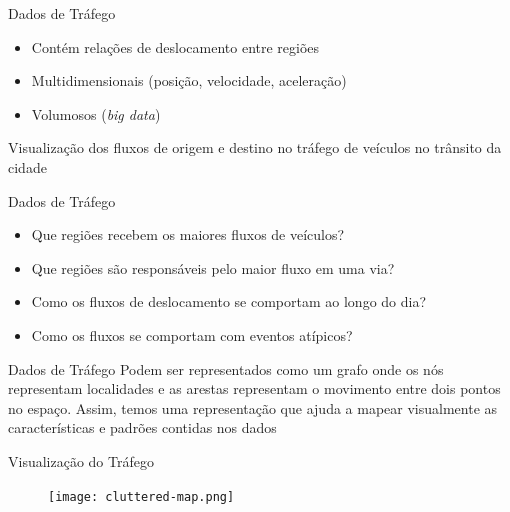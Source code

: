 
\begin{frame}{Dados de Tráfego}
  \begin{itemize}
    \item Contém relações de deslocamento entre regiões
    \item Multidimensionais (posição, velocidade, aceleração)
    \item Volumosos (\emph{big data})
  \end{itemize}
\end{frame}

\begin{frame}[standout]
  Visualização dos fluxos de origem e destino no tráfego de veículos no
trânsito da cidade
\end{frame}

\begin{frame}{Dados de Tráfego}
  \begin{itemize}
    \item Que regiões recebem os maiores fluxos de veículos?
    \item Que regiões são responsáveis pelo maior fluxo em uma via?
    \item Como os fluxos de deslocamento se comportam ao longo do dia?
    \item Como os fluxos se comportam com eventos atípicos?
  \end{itemize}
\end{frame}

\begin{frame}{Dados de Tráfego}
  Podem ser representados como um grafo onde os nós representam localidades e
as arestas representam o movimento entre dois pontos no espaço. Assim, temos
uma representação que ajuda a mapear visualmente as características e padrões
contidas nos dados
\end{frame}

{
\begin{frame}{Visualização do Tráfego}
  \begin{figure}[!htb]
    \centering
    \texttt{[image: cluttered-map.png]}
  \end{figure}
\end{frame}
}

